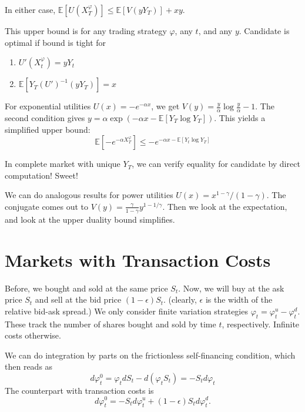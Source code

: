 In either case, $\mathbb{E}[U(X_T^\varphi)] \leq \mathbb{E}[V(yY_T)] + xy$.

This upper bound is for any trading strategy $\varphi$, any $t$, and any $y$. Candidate is optimal if bound is tight for
\begin{enumerate}
	\item $U'(X_t^\varphi) = yY_t$
	\item $\mathbb{E}[ Y_T (U')^{-1}(yY_T) ] = x$
\end{enumerate}

For exponential utilities $U(x) = -e^{-\alpha x}$, we get $V(y) = \frac{y}{\alpha} \log \frac{y}{\alpha} - 1$. The second condition gives $y = \alpha \exp (-\alpha x - \mathbb{E}[ Y_T \log Y_T ])$. This yields a simplified upper bound:
\begin{equation}
	\mathbb{E} [ -e^{-\alpha X_T^\varphi}] \leq -e^{-\alpha x - \mathbb{E} [ Y_t \log Y_T ]}
\end{equation}

In complete market with unique $Y_T$, we can verify equality for candidate by direct computation! Sweet!


We can do analogous results for power utilities $U(x) = x^{1-\gamma}/ (1-\gamma)$. The conjugate comes out to $V(y) = \frac{\gamma}{1-\gamma} y^{1-1/\gamma}$. Then we look at the expectation, and look at the upper duality bound simplifies.


\section{Markets with Transaction Costs}
Before, we bought and sold at the same price $S_t$. Now, we will buy at the ask price $S_t$ and sell at the bid price $(1-\epsilon)S_t$. (clearly, $\epsilon$ is the width of the relative bid-ask spread.)  We only consider finite variation strategies $\varphi_t = \varphi_t^u - \varphi_t^d$. These track the number of shares bought and sold by time $t$, respectively. Infinite costs otherwise.

We can do integration by parts on the frictionless self-financing condition, which then reads as
\begin{equation}
	d\varphi_t^0 = \varphi_t dS_t - d(\varphi_tS_t) = -S_td\varphi_t
\end{equation}
The counterpart with transaction costs is
\begin{equation}
	d\varphi_t^0  = -S_td\varphi_t^u + (1-\epsilon)S_t d\varphi_t^d.
\end{equation}


